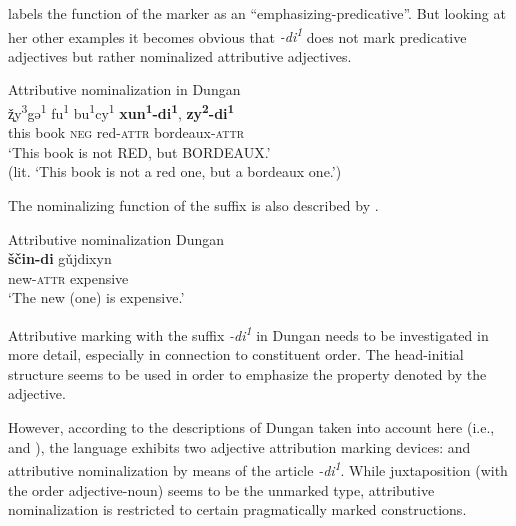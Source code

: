 \citet[82]{zevachina2001} labels the function of the marker as an “emphasizing\hyp{}predicative”. But looking at her other examples it becomes obvious that \textit{-di\textsuperscript{1}} does not mark predicative adjectives but rather nominalized attributive adjectives.
\begin{exe}
\ex \rm{Attributive nominalization in Dungan \citep[82]{zevachina2001}}\\
\gll	ž̨y\textsuperscript{3}gə\textsuperscript{1} fu\textsuperscript{1} bu\textsuperscript{1}cy\textsuperscript{1} \textbf{xun\textsuperscript{1}-di\textsuperscript{1}}, \textbf{zy\textsuperscript{2}-di\textsuperscript{1}}\\
	this book \textsc{neg} red-\textsc{attr} bordeaux-\textsc{attr}\\
\glt	‘This book is not RED, but BORDEAUX.’\\
	(lit. ‘This book is not a red one, but a bordeaux one.’)
\end{exe}
The nominalizing function of the suffix is also described by \cite{kalimov1968}.
\begin{exe}
\ex \rm{Attributive nominalization Dungan \citep[484]{kalimov1968}}\\ \label{dungan nmlz}
\gll	\textbf{ščin-di} gǔjdixyn\\
	new-\textsc{attr} expensive\\
\glt	‘The new (one) is expensive.’
\end{exe}
Attributive marking with the suffix \textit{-di\textsuperscript{1}} in Dungan needs to be investigated in more detail, especially in connection to constituent order. The head-initial structure seems to be used in order to emphasize the property denoted by the adjective.

However, according to the descriptions of Dungan taken into account here (i.e.,~\citealt{kalimov1968} and \citealt{zevachina2001}), the language exhibits two adjective attribution marking devices:  and attributive nominalization by means of the article \textit{-di\textsuperscript{1}}. While juxtaposition (with the order adjective-noun) seems to be the unmarked type, attributive nominalization is restricted to certain pragmatically marked constructions.

